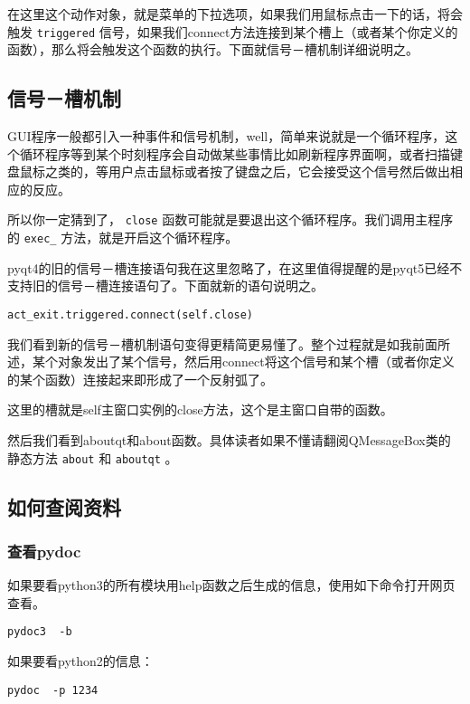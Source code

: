 \documentclass[11pt,oneside]{article}
\begin{document}
在这里这个动作对象，就是菜单的下拉选项，如果我们用鼠标点击一下的话，将会触发 \texttt{triggered} 信号，如果我们connect方法连接到某个槽上（或者某个你定义的函数），那么将会触发这个函数的执行。下面就信号－槽机制详细说明之。

\subsection{信号－槽机制}
\label{sec:orgheadline14}
GUI程序一般都引入一种事件和信号机制，well，简单来说就是一个循环程序，这个循环程序等到某个时刻程序会自动做某些事情比如刷新程序界面啊，或者扫描键盘鼠标之类的，等用户点击鼠标或者按了键盘之后，它会接受这个信号然后做出相应的反应。

所以你一定猜到了， \texttt{close} 函数可能就是要退出这个循环程序。我们调用主程序的 \texttt{exec\_} 方法，就是开启这个循环程序。

pyqt4的旧的信号－槽连接语句我在这里忽略了，在这里值得提醒的是pyqt5已经不支持旧的信号－槽连接语句了。下面就新的语句说明之。

\begin{verbatim}
act_exit.triggered.connect(self.close)
\end{verbatim}

我们看到新的信号－槽机制语句变得更精简更易懂了。整个过程就是如我前面所述，某个对象发出了某个信号，然后用connect将这个信号和某个槽（或者你定义的某个函数）连接起来即形成了一个反射弧了。


这里的槽就是self主窗口实例的close方法，这个是主窗口自带的函数。

然后我们看到aboutqt和about函数。具体读者如果不懂请翻阅QMessageBox类的静态方法 \texttt{about} 和 \texttt{aboutqt} 。






\subsection{如何查阅资料}
\label{sec:orgheadline17}
\subsubsection{查看pydoc}
\label{sec:orgheadline15}
如果要看python3的所有模块用help函数之后生成的信息，使用如下命令打开网页查看。

\begin{Verbatim}
pydoc3  -b
\end{Verbatim}


如果要看python2的信息：
\begin{Verbatim}
pydoc  -p 1234
\end{Verbatim}
\end{document}
